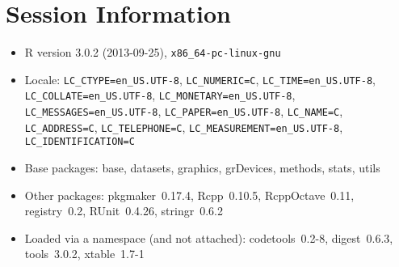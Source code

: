 \documentclass[10pt]{article}\usepackage[]{graphicx}\usepackage[]{color}
\begin{document}
\section*{Session Information}
\begin{itemize}\raggedright
  \item R version 3.0.2 (2013-09-25), \verb|x86_64-pc-linux-gnu|
  \item Locale: \verb|LC_CTYPE=en_US.UTF-8|, \verb|LC_NUMERIC=C|, \verb|LC_TIME=en_US.UTF-8|, \verb|LC_COLLATE=en_US.UTF-8|, \verb|LC_MONETARY=en_US.UTF-8|, \verb|LC_MESSAGES=en_US.UTF-8|, \verb|LC_PAPER=en_US.UTF-8|, \verb|LC_NAME=C|, \verb|LC_ADDRESS=C|, \verb|LC_TELEPHONE=C|, \verb|LC_MEASUREMENT=en_US.UTF-8|, \verb|LC_IDENTIFICATION=C|
  \item Base packages: base, datasets, graphics, grDevices, methods,
    stats, utils
  \item Other packages: pkgmaker~0.17.4, Rcpp~0.10.5, RcppOctave~0.11,
    registry~0.2, RUnit~0.4.26, stringr~0.6.2
  \item Loaded via a namespace (and not attached): codetools~0.2-8,
    digest~0.6.3, tools~3.0.2, xtable~1.7-1
\end{itemize}
\end{document}
